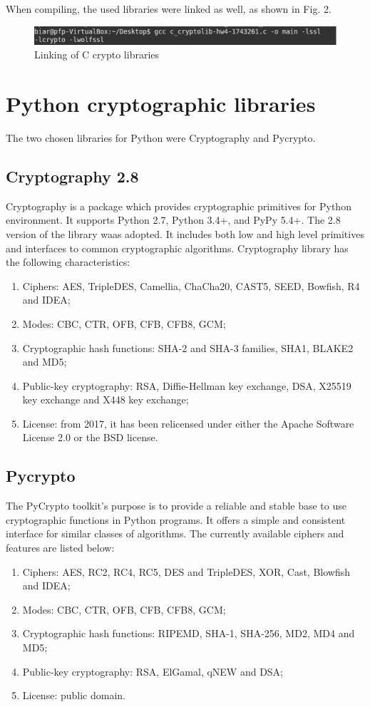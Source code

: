 \documentclass[11 pt]{article}
\begin{document}
When compiling, the used libraries were linked as well, as shown in Fig. 2.\\


\begin{figure}[!h]
	\includegraphics[width=1\textwidth]{c_link-hw4-1743261.png}
	\caption{Linking of C crypto libraries}
\end{figure}

\section{Python cryptographic libraries}
The two chosen libraries for Python were Cryptography and Pycrypto.

\subsection{Cryptography 2.8}
Cryptography is a package which provides cryptographic primitives for Python environment. It supports Python 2.7, Python 3.4+, and PyPy 5.4+. The 2.8 version of the library waas adopted. It includes both low and high level primitives and interfaces to common cryptographic algorithms. Cryptography library has the following characteristics:
\begin{enumerate}
	\item Ciphers: AES, TripleDES, Camellia, ChaCha20, CAST5, SEED, Bowfish, R4 and IDEA;
	\item Modes: CBC, CTR, OFB, CFB, CFB8, GCM;
	\item Cryptographic hash functions: SHA-2 and SHA-3 families, SHA1, BLAKE2 and MD5;
	\item Public-key cryptography: RSA, Diffie-Hellman key exchange, DSA, X25519 key exchange and X448 key exchange;
	\item License: from 2017, it has been relicensed under either the Apache Software License 2.0 or the BSD license.
\end{enumerate}

\subsection{Pycrypto}
The PyCrypto toolkit's purpose is to provide a reliable and stable base to use cryptographic functions in Python programs. It offers a simple and consistent interface for similar classes of algorithms. The currently available ciphers and features are listed below:
\begin{enumerate}
	\item Ciphers: AES, RC2, RC4, RC5, DES and TripleDES, XOR, Cast, Blowfish and IDEA;
	\item Modes: CBC, CTR, OFB, CFB, CFB8, GCM;
	\item Cryptographic hash functions: RIPEMD, SHA-1, SHA-256, MD2, MD4 and MD5;
	\item Public-key cryptography: RSA, ElGamal, qNEW and DSA;
	\item License: public domain.
\end{enumerate}
\end{document}

